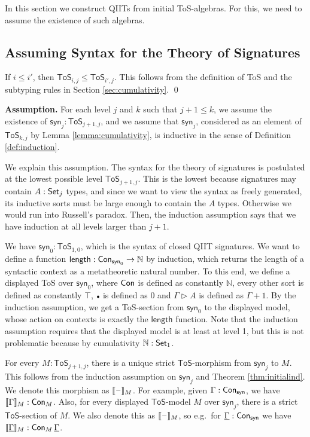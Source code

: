 \documentclass[sigplan,review,anonymous]{acmart}\settopmatter{printfolios=true,printccs=false,printacmref=false}
\newcommand{\ToS}{\mathsf{ToS}}
\newcommand{\ext}{\triangleright}
\newcommand{\emptycon}{\scaleobj{.75}\bullet}
\newcommand{\syn}{\mathsf{syn}}
\newcommand{\ul}[1]{\underline{#1}}
\newcommand{\ulGamma}{\ul{\Gamma}}
\begin{document}
In this section we construct QIITs from initial ToS-algebras. For this, we need
to assume the existence of such algebras.

\subsection{Assuming Syntax for the Theory of Signatures}

\begin{lemma}[Cumulativity of $\ToS$]\label{lemma:cumulativity} If $i \leq i'$, then $\ToS_{i,j} \leq \ToS_{i', j}$.
  This follows from the definition of ToS and the subtyping rules in Section
  \ref{sec:cumulativity}. \qed
\end{lemma}

\textbf{Assumption.} For each level $j$ and $k$ such that $j+1 \leq k$, we
assume the existence of $\syn_j : \ToS_{j+1,j}$, and we assume that $\syn_j$,
considered as an element of $\ToS_{k,j}$ by Lemma \ref{lemma:cumulativity}, is
inductive in the sense of Definition \ref{def:induction}.

We explain this assumption. The syntax for the theory of signatures is
postulated at the lowest possible level $\ToS_{j+1,j}$. This is the lowest
because signatures may contain $A : \mathsf{Set}_j$ types, and since we want to view the
syntax as freely generated, its inductive sorts must be large enough to contain
the $A$ types. Otherwise we would run into Russell's paradox. Then, the
induction assumption says that we have induction at all levels larger than
$j+1$.

\begin{example} We have $\syn_0 : \ToS_{1, 0}$, which is the syntax of closed QIIT signatures. We want to define a function $\mathsf{length} : \Con_{\syn_0} \ra \mathbb{N}$ by induction, which returns the length of a syntactic context as a metatheoretic natural number. To this end, we define a displayed ToS over $\syn_0$, where $\mathsf{Con}$ is defined as constantly $\mathbb{N}$, every other sort is defined as constantly $\top$, $\emptycon$ is defined as $0$ and $\Gamma\ext A$ is defined as $\Gamma + 1$. By the induction assumption, we get a ToS-section from $\syn_0$ to the displayed model, whose action on contexts is exactly the $\mathsf{length}$ function. Note that the induction assumption requires that the displayed model is at least at level 1, but this is not problematic because by cumulativity $\mathbb{N} : \mathsf{Set}_1$.
\end{example}

For every $M : \ToS_{j+1,j}$, there is a unique strict $\ToS$-morphism from
$\syn_j$ to $M$. This follows from the induction assumption on $\syn_j$ and
Theorem \ref{thm:initialind}. We denote this morphism as
$\llbracket\mathord{\hspace{1pt}\text{--}\hspace{1pt}}\rrbracket_M$.  For example, given $\Gamma : \Con_\syn$, we
have $\llbracket\Gamma\rrbracket_M : \mathsf{Con}_M$.  Also, for every displayed
$\ToS$-model $M$ over $\syn_j$, there is a strict $\ToS$-section of $M$. We also
denote this as $\llbracket\mathord{\hspace{1pt}\text{--}\hspace{1pt}}\rrbracket_M$, so e.g.\ for $\ulGamma :
\Con_\syn$ we have $\llbracket\ulGamma\rrbracket_M : \Con_M\,\ulGamma$.
\end{document}
